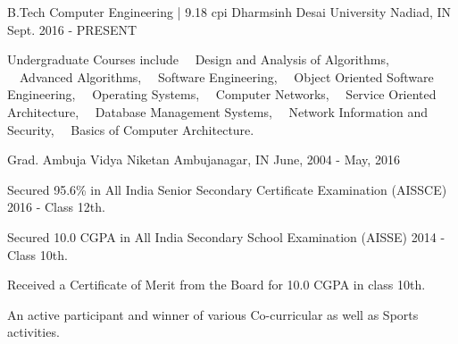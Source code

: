 


\begin{cventries}

\cventry
{B.Tech Computer Engineering | 9.18 cpi} %
{Dharmsinh Desai University} %
{Nadiad, IN} %
{Sept. 2016 - PRESENT} %
{ %
\begin{cvitems}
\item {Undergraduate Courses include ~~Design and Analysis of Algorithms, ~~Advanced Algorithms, ~~Software Engineering, ~~Object Oriented Software Engineering, ~~Operating Systems, ~~Computer Networks, ~~Service Oriented Architecture,  ~~Database Management Systems, ~~Network Information and Security, ~~Basics of Computer Architecture.}
\end{cvitems}
}




\cventry
{Grad.} %
{Ambuja Vidya Niketan} %
{Ambujanagar, IN} %
{June, 2004 - May, 2016} %
{ %
\begin{cvitems}
\item {Secured 95.6\% in All India Senior Secondary Certificate Examination (AISSCE) 2016 - Class 12th.}
\item {Secured 10.0 CGPA in All India Secondary School Examination (AISSE) 2014 - Class 10th.}
\item {Received a Certificate of Merit from the Board for 10.0 CGPA in class 10th.}
\item {An active participant and winner of various Co-curricular as well as Sports activities.}
\end{cvitems}
}

\end{cventries}

